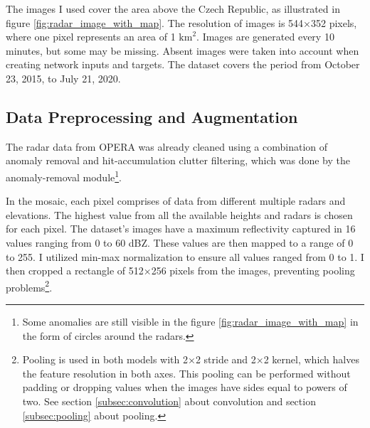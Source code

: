 The images I used cover the area above the Czech Republic, as illustrated in figure \ref{fig:radar_image_with_map}. The resolution of images is 544×352 pixels, where one pixel represents an area of 1 $\text{km}^2$. Images are generated every 10 minutes, but some may be missing. Absent images were taken into account when creating network inputs and targets. The dataset covers the period from October 23, 2015, to July 21, 2020.

\subsection{Data Preprocessing and Augmentation}
\label{sec:data_preprocessing}

The radar data from \gls{OPERA} was already cleaned using a combination of anomaly removal and hit-accumulation clutter filtering, which was done by the anomaly-removal module\footnote{Some anomalies are still visible in the figure \ref{fig:radar_image_with_map} in the form of circles around the radars.}.

In the mosaic, each pixel comprises of data from different multiple radars and elevations. The highest value from all the available heights and radars is chosen for each pixel. The dataset's images have a maximum reflectivity captured in 16 values ranging from 0 to 60 dBZ. These values are then mapped to a range of 0 to 255. I utilized min-max normalization to ensure all values ranged from 0 to 1. I then cropped a rectangle of 512×256 pixels from the images, preventing pooling problems\footnote{Pooling is used in both models with 2×2 stride and 2×2 kernel, which halves the feature resolution in both axes. This pooling can be performed without padding or dropping values when the images have sides equal to powers of two. See section \ref{subsec:convolution} about convolution and section \ref{subsec:pooling} about pooling.}.

